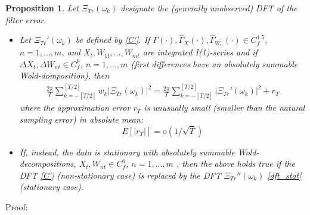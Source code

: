 \documentclass[11pt]{article}
\newtheorem{Proposition}{Proposition}
\begin{document}
\begin{appendix}
\begin{Proposition}\label{super_consistency}
Let  $\Xi_{Tr}(\omega_k)$ designate the (generally unobserved) DFT of the filter error. 
\begin{itemize}
\item  Let $\Xi_{Tr}'(\omega_k)$ be defined by \ref{C'}. If $\Gamma(\cdot),\hat{\Gamma}_X(\cdot),\hat{\Gamma}_{W_n}(\cdot)\in C_f^{1.5}$, $n=1,...,m$, and $X_t,W_{1t},...,W_{mt}$ are integrated I(1)-series and if $\Delta X_t,\Delta W_{nt}\in C_f^0$, $n=1,...,m$ (first differences have an absolutely summable Wold-domposition), then  
\begin{eqnarray*}
\frac{2\pi}{T}\sum_{k=-[T/2]}^{[T/2]}w_k\left|\Xi_{Tr}(\omega_k)\right|^2=\frac{2\pi}{T}\sum_{k=-[T/2]}^{[T/2]}\left|\Xi_{Tr}'(\omega_k)\right|^2+r_T
\end{eqnarray*}
where the approximation error $r_T$ is unusually small (smaller than the natural sampling error)  in absolute mean:
\[E[|r_T|]=\textrm{o}(1/\sqrt{T})\]
\item If, instead, the data is stationary with absolutely summable Wold-decompositions, $X_t, W_{nt}\in C_f^0$, $n=1,...,m$ , then the above holds true if the DFT \ref{C'} (non-stationary case) is replaced by the DFT $\Xi_{Tr}''(\omega_k)$ \ref{dft_stat} (stationary case).
\end{itemize}
\end{Proposition}
Proof:\\


\end{appendix}
\end{document}
